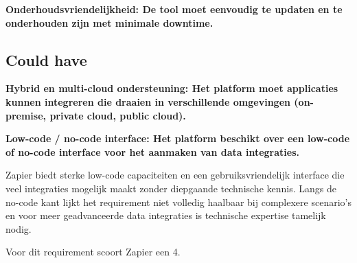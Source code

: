 \vspace{\baselineskip}



\vspace{\baselineskip}

\textbf{Onderhoudsvriendelijkheid: De tool moet eenvoudig te updaten en te onderhouden zijn met minimale downtime.}

\vspace{\baselineskip}



\vspace{\baselineskip}

\subsection{Could have}%
\label{CouldHaveZapier}

\textbf{Hybrid en multi-cloud ondersteuning: Het platform moet applicaties kunnen integreren die draaien in verschillende omgevingen (on-premise, private cloud, public cloud).}

\vspace{\baselineskip}



\vspace{\baselineskip}

\textbf{Low-code / no-code interface: Het platform beschikt over een low-code of no-code interface voor het aanmaken van data integraties.}

\vspace{\baselineskip}

Zapier biedt sterke low-code capaciteiten en een gebruiksvriendelijk interface die veel integraties mogelijk maakt zonder diepgaande technische kennis. Langs de no-code kant lijkt het requirement niet volledig haalbaar bij complexere scenario's en voor meer geadvanceerde data integraties is technische expertise tamelijk nodig.

Voor dit requirement scoort Zapier een 4.

\newpage

